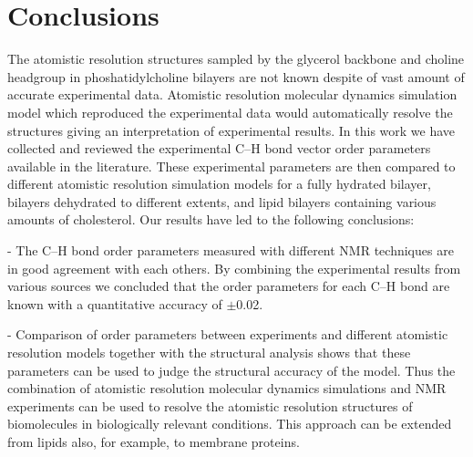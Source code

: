 \documentclass[journal=jacsat,manuscript=article]{achemso}
\begin{document}
\pagebreak
\section{Conclusions}
The atomistic resolution structures sampled by the glycerol backbone and choline headgroup
in phoshatidylcholine bilayers are not known despite of vast amount of accurate experimental
data. Atomistic resolution molecular dynamics simulation model which reproduced the
experimental data would automatically resolve the structures giving an interpretation of experimental results.
In this work we have collected and reviewed the experimental C--H bond vector order
parameters available in the literature. These experimental parameters are then compared to
different atomistic resolution simulation models for a fully hydrated bilayer, bilayers dehydrated to different extents, and
lipid bilayers containing various amounts of cholesterol. Our results have led to the following conclusions:

- The C--H bond order parameters measured with different NMR techniques are in good agreement
with each others. By combining the experimental results from various sources we concluded
that the order parameters for each C--H bond are known with a quantitative accuracy of $\pm$0.02.

- Comparison of order parameters between experiments and different atomistic resolution models 
together with the structural analysis shows that these parameters can be used
to judge the structural accuracy of the model. Thus the combination of atomistic resolution 
molecular dynamics simulations and NMR experiments can be used to resolve the atomistic resolution
structures of biomolecules in biologically relevant conditions. 
This approach can be extended from lipids also, for example, to membrane proteins.

\end{document}
